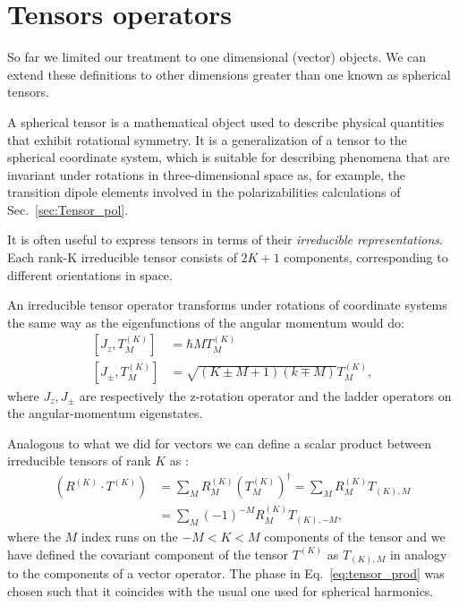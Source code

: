 \section{Tensors operators}
So far we limited our treatment to one dimensional (vector) objects. We can extend these definitions to other dimensions greater than one known as spherical tensors.

A spherical tensor is a mathematical object used to describe physical quantities that exhibit rotational symmetry. It is a generalization of a tensor to the spherical coordinate system, which is suitable for describing phenomena that are invariant under rotations in three-dimensional space as, for example, the transition dipole elements involved in the polarizabilities calculations of Sec.~\ref{sec:Tensor_pol}.

It is often useful to express tensors in terms of their \emph{irreducible representations}. Each rank-K irreducible tensor consists of $2K+1$ components, corresponding to different orientations in space.

An irreducible tensor operator transforms under rotations of coordinate systems the same way as the eigenfunctions of the angular momentum would do:
\begin{align}
	\left[J_z,T^{\left(K\right)}_M\right] &= \hbar M T^{\left(K\right)}_M\nonumber\\
	\left[J_{\pm},T^{\left(K\right)}_M\right] &= \sqrt{\left(K\pm M+1\right)\left(k\mp M\right)}T^{\left(K\right)}_M,
\end{align}
where $J_z, J_{\pm}$ are respectively the z-rotation operator and the ladder operators on the angular-momentum eigenstates.


Analogous to what we did for vectors we can define a scalar product between irreducible tensors of rank $K$ as :
\begin{align}
	\left(R^{\left(K\right)}\cdot T^{\left(K\right)}\right) &= \sum\limits_M R^{\left(K\right)}_M \left(T^{\left(K\right)}_{M}\right)^\dagger = \sum\limits_M R^{\left(K\right)}_M T_{\left(K\right),M}\nonumber\\
	&= \sum\limits_M\left(-1\right)^{-M} R^{\left(K\right)}_M T_{\left(K\right),-M},
	\label{eq:tensor_prod}
\end{align} 
where the $M$ index runs on the $-M<K<M$ components of the tensor and we have defined the covariant component of the tensor $T^{\left(K\right)}$ as $T_{\left(K\right),M}$ in analogy to the components of a vector operator. The phase  in Eq.~\eqref{eq:tensor_prod} was chosen such that it coincides with the usual one used for spherical harmonics.

